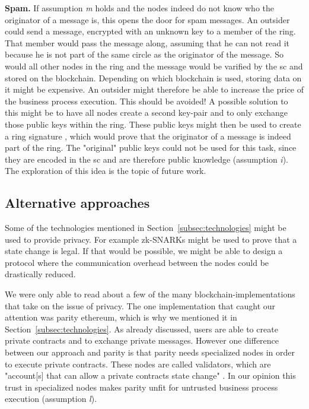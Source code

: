 \documentclass[runningheads]{llncs}
\newcommand{\ber}[1]{\textit{#1}}
\newcommand{\refsec}[1]{Section~\ref{#1}}
\renewcommand{\bigbreak}{}
\begin{document}
\bigbreak
\textbf{Spam.} If assumption \ber{m} holds and the nodes indeed do not know who the originator of a message is, this opens the door for spam messages. An outsider could send a message, encrypted with an unknown key to a member of the ring. That member would pass the message along, assuming that he can not read it because he is not part of the same circle as the originator of the message. So would all other nodes in the ring and the message would be varified by the sc and stored on the blockchain. Depending on which blockchain is used, storing data on it might be expensive. An outsider might therefore be able to increase the price of the business process execution. This should be avoided! A possible solution to this might be to have all nodes create a second key-pair and to only exchange those public keys within the ring. These public keys might then be used to create a ring signature \cite{rivest2001leak}, which would prove that the originator of a message is indeed part of the ring. The "original" public keys could not be used for this task, since they are encoded in the sc and are therefore public knowledge (assumption \ber{i}). The exploration of this idea is the topic of future work.





\subsection{Alternative approaches}

Some of the technologies mentioned in \refsec{subsec:technologies} might be used to provide privacy. For example zk-SNARKs might be used to prove that a state change is legal. If that would be possible, we might be able to design a protocol where the communication overhead between the nodes could be drastically reduced. 


We were only able to read about a few of the many blockchain-implementations that take on the issue of privacy. The one implementation that caught our attention was parity ethereum, which is why we mentioned it in \refsec{subsec:technologies}. As already discussed, users are able to create private contracts and to exchange private messages. However one difference between our approach and parity is that parity needs specialized nodes in order to execute private contracts. These nodes are called validators, which are "account[s] that can allow a private contracts state change" \cite{parity}. In our opinion this trust in specialized nodes makes parity unfit for untrusted business process execution (assumption \ber{l}).
\end{document}
